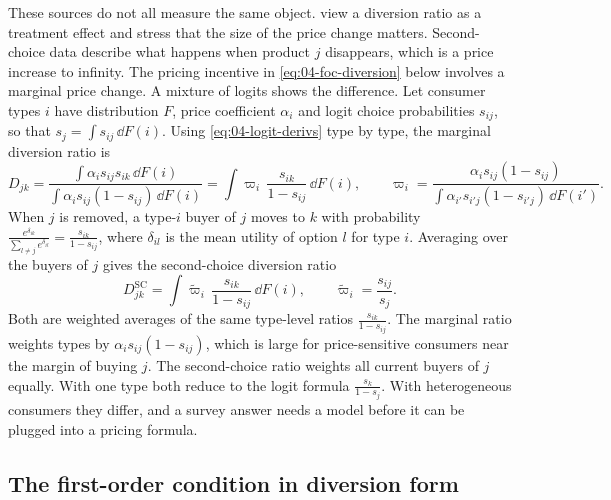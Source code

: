 These sources do not all measure the same object. \citet{ConlonMortimer2021} view a diversion ratio as a
treatment effect and stress that the size of the price change matters. Second-choice data describe what
happens when product $j$ disappears, which is a price increase to infinity. The pricing incentive in
\eqref{eq:04-foc-diversion} below involves a marginal price change. A mixture of logits shows the
difference. Let consumer types $i$ have distribution $F$, price coefficient $\alpha_i$ and logit choice
probabilities $s_{ij}$, so that $s_j = \int s_{ij}\,\dd F(i)$. Using \eqref{eq:04-logit-derivs} type by type,
the marginal diversion ratio is
\begin{equation}\label{eq:04-diversion-marginal}
  D_{jk} = \frac{\int \alpha_i s_{ij}s_{ik}\,\dd F(i)}{\int \alpha_i s_{ij}(1 - s_{ij})\,\dd F(i)}
         = \int \varpi_i\,\frac{s_{ik}}{1 - s_{ij}}\,\dd F(i),
  \qquad \varpi_i = \frac{\alpha_i s_{ij}(1 - s_{ij})}{\int \alpha_{i'} s_{i'j}(1 - s_{i'j})\,\dd F(i')}.
\end{equation}
When $j$ is removed, a type-$i$ buyer of $j$ moves to $k$ with probability
$\frac{e^{\delta_{ik}}}{\sum_{l \neq j}e^{\delta_{il}}} = \frac{s_{ik}}{1 - s_{ij}}$, where $\delta_{il}$ is the
mean utility of option $l$ for type $i$. Averaging over the buyers of $j$ gives the second-choice diversion
ratio
\begin{equation}\label{eq:04-diversion-secondchoice}
  D^{\mathrm{SC}}_{jk} = \int \tilde\varpi_i\,\frac{s_{ik}}{1 - s_{ij}}\,\dd F(i), \qquad \tilde\varpi_i = \frac{s_{ij}}{s_j}.
\end{equation}
Both are weighted averages of the same type-level ratios $\frac{s_{ik}}{1 - s_{ij}}$. The marginal ratio
weights types by $\alpha_i s_{ij}(1 - s_{ij})$, which is large for price-sensitive consumers near the margin
of buying $j$. The second-choice ratio weights all current buyers of $j$ equally. With one type both reduce
to the logit formula $\frac{s_k}{1 - s_j}$. With heterogeneous consumers they differ, and a survey answer
needs a model before it can be plugged into a pricing formula.

\subsection{The first-order condition in diversion form}\label{sec:04-diversion-foc}

